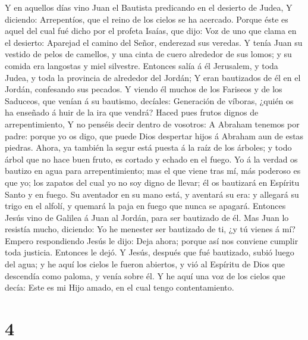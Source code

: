  Y en aquellos días vino Juan el Bautista predicando en el
desierto de Judea,  Y diciendo: Arrepentíos, que el reino de
los cielos se ha acercado.  Porque éste es aquel del cual
fué dicho por el profeta Isaías, que dijo: Voz de uno que clama en el
desierto: Aparejad el camino del Señor, enderezad sus veredas.
 Y tenía Juan su vestido de pelos de camellos, y una cinta
de cuero alrededor de sus lomos; y su comida era langostas y miel
silvestre.  Entonces salía á él Jerusalem, y toda Judea, y
toda la provincia de alrededor del Jordán;  Y eran
bautizados de él en el Jordán, confesando sus pecados.  Y
viendo él muchos de los Fariseos y de los Saduceos, que venían á su
bautismo, decíales: Generación de víboras, ¿quién os ha enseñado á huir
de la ira que vendrá?  Haced pues frutos dignos de
arrepentimiento,  Y no penséis decir dentro de vosotros: A
Abraham tenemos por padre: porque yo os digo, que puede Dios despertar
hijos á Abraham aun de estas piedras.  Ahora, ya también la
segur está puesta á la raíz de los árboles; y todo árbol que no hace
buen fruto, es cortado y echado en el fuego.  Yo á la
verdad os bautizo en agua para arrepentimiento; mas el que viene tras
mí, más poderoso es que yo; los zapatos del cual yo no soy digno de
llevar; él os bautizará en Espíritu Santo y en fuego.  Su
aventador en su mano está, y aventará su era: y allegará su trigo en el
alfolí, y quemará la paja en fuego que nunca se apagará. 
Entonces Jesús vino de Galilea á Juan al Jordán, para ser bautizado de
él.  Mas Juan lo resistía mucho, diciendo: Yo he menester
ser bautizado de ti, ¿y tú vienes á mí?  Empero
respondiendo Jesús le dijo: Deja ahora; porque así nos conviene cumplir
toda justicia. Entonces le dejó.  Y Jesús, después que fué
bautizado, subió luego del agua; y he aquí los cielos le fueron
abiertos, y vió al Espíritu de Dios que descendía como paloma, y venía
sobre él.  Y he aquí una voz de los cielos que decía: Este
es mi Hijo amado, en el cual tengo contentamiento.

\hypertarget{section-3}{%
\section{4}\label{section-3}}

